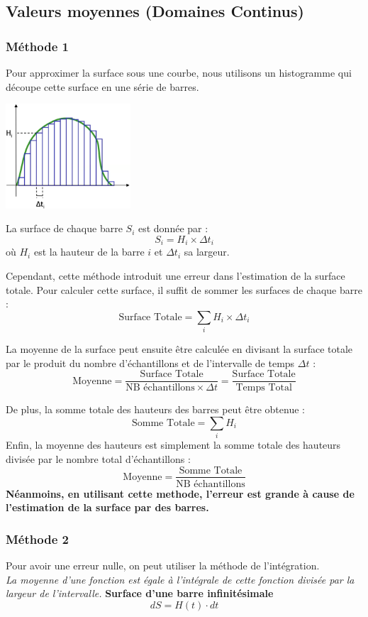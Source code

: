 \subsection{Valeurs moyennes (Domaines Continus)}
\subsubsection{Méthode 1}
Pour approximer la surface sous une courbe, nous utilisons un histogramme qui découpe cette surface en une série de barres.
\begin{center}
    \includegraphics[width=0.35\textwidth]{chapters/chapter1/images/histogramme.png}
\end{center}

La surface de chaque barre $S_i$ est donnée par :
\[
S_i = H_i \times \Delta t_i
\]
où $H_i$ est la hauteur de la barre $i$ et $\Delta t_i$ sa largeur.

Cependant, cette méthode introduit une erreur dans l'estimation de la surface totale. Pour calculer cette surface, il suffit de sommer les surfaces de chaque barre :
\[
\text{Surface Totale} = \sum_i H_i \times \Delta t_i
\]

La moyenne de la surface peut ensuite être calculée en divisant la surface totale par le produit du nombre d'échantillons et de l'intervalle de temps $\Delta t$ :
\[
\text{Moyenne} = \frac{\text{Surface Totale}}{\text{NB échantillons} \times \Delta t} = \frac{\text{Surface Totale}}{\text{Temps Total}}
\]

De plus, la somme totale des hauteurs des barres peut être obtenue :
\[
\text{Somme Totale} = \sum_i H_i
\]
Enfin, la moyenne des hauteurs est simplement la somme totale des hauteurs divisée par le nombre total d'échantillons :
\[
\text{Moyenne} = \frac{\text{Somme Totale}}{\text{NB échantillons}}
\]
\textbf{Néanmoins, en utilisant cette methode, l'erreur est grande à cause de l'estimation de la surface par des barres.}
\subsubsection{Méthode 2}
Pour avoir une erreur nulle, on peut utiliser la méthode de l'intégration. \\
\textit{La moyenne d'une fonction est égale à l'intégrale de cette fonction divisée par la largeur de l'intervalle.}
\textbf{Surface d'une barre infinitésimale} 
\[
dS = H(t) \cdot dt
\]


